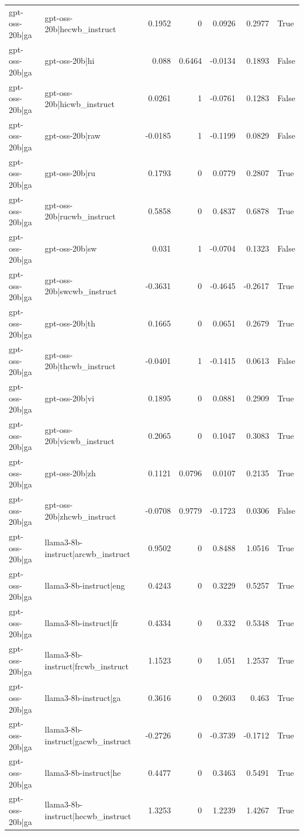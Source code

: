 \begin{table}
\begin{tabular}{l l r r r r l}
gpt-oss-20b|ga & gpt-oss-20b|hecwb_instruct & 0.1952 & 0 & 0.0926 & 0.2977 & True \\
gpt-oss-20b|ga & gpt-oss-20b|hi & 0.088 & 0.6464 & -0.0134 & 0.1893 & False \\
gpt-oss-20b|ga & gpt-oss-20b|hicwb_instruct & 0.0261 & 1 & -0.0761 & 0.1283 & False \\
gpt-oss-20b|ga & gpt-oss-20b|raw & -0.0185 & 1 & -0.1199 & 0.0829 & False \\
gpt-oss-20b|ga & gpt-oss-20b|ru & 0.1793 & 0 & 0.0779 & 0.2807 & True \\
gpt-oss-20b|ga & gpt-oss-20b|rucwb_instruct & 0.5858 & 0 & 0.4837 & 0.6878 & True \\
gpt-oss-20b|ga & gpt-oss-20b|sw & 0.031 & 1 & -0.0704 & 0.1323 & False \\
gpt-oss-20b|ga & gpt-oss-20b|swcwb_instruct & -0.3631 & 0 & -0.4645 & -0.2617 & True \\
gpt-oss-20b|ga & gpt-oss-20b|th & 0.1665 & 0 & 0.0651 & 0.2679 & True \\
gpt-oss-20b|ga & gpt-oss-20b|thcwb_instruct & -0.0401 & 1 & -0.1415 & 0.0613 & False \\
gpt-oss-20b|ga & gpt-oss-20b|vi & 0.1895 & 0 & 0.0881 & 0.2909 & True \\
gpt-oss-20b|ga & gpt-oss-20b|vicwb_instruct & 0.2065 & 0 & 0.1047 & 0.3083 & True \\
gpt-oss-20b|ga & gpt-oss-20b|zh & 0.1121 & 0.0796 & 0.0107 & 0.2135 & True \\
gpt-oss-20b|ga & gpt-oss-20b|zhcwb_instruct & -0.0708 & 0.9779 & -0.1723 & 0.0306 & False \\
gpt-oss-20b|ga & llama3-8b-instruct|arcwb_instruct & 0.9502 & 0 & 0.8488 & 1.0516 & True \\
gpt-oss-20b|ga & llama3-8b-instruct|eng & 0.4243 & 0 & 0.3229 & 0.5257 & True \\
gpt-oss-20b|ga & llama3-8b-instruct|fr & 0.4334 & 0 & 0.332 & 0.5348 & True \\
gpt-oss-20b|ga & llama3-8b-instruct|frcwb_instruct & 1.1523 & 0 & 1.051 & 1.2537 & True \\
gpt-oss-20b|ga & llama3-8b-instruct|ga & 0.3616 & 0 & 0.2603 & 0.463 & True \\
gpt-oss-20b|ga & llama3-8b-instruct|gacwb_instruct & -0.2726 & 0 & -0.3739 & -0.1712 & True \\
gpt-oss-20b|ga & llama3-8b-instruct|he & 0.4477 & 0 & 0.3463 & 0.5491 & True \\
gpt-oss-20b|ga & llama3-8b-instruct|hecwb_instruct & 1.3253 & 0 & 1.2239 & 1.4267 & True \\

\end{tabular}
\end{table}
